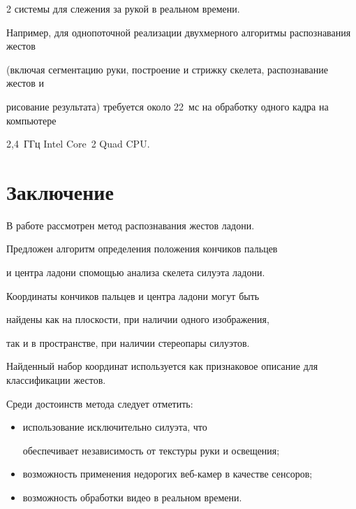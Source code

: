 \begin{multicols}{2}
системы для слежения за рукой в реальном времени.


Например, для однопоточной реализации двухмерного алгоритмы распознавания жестов 


(включая сегментацию руки, построение и стрижку скелета, распознавание жестов и 


рисование результата) требуется около 22~мс на обработку одного кадра на компьютере 


2,4~ГГц Intel Core~2 Quad CPU.





\section{Заключение}\label{sec:Conclusion}





В работе рассмотрен метод распознавания жес\-тов ладони.


Предложен алгоритм определения положения кончиков пальцев 


и центра ладони с\linebreak помощью анализа скелета силуэта ладони.


Координаты кончиков пальцев и центра ладони могут быть 


найдены как на плоскости, при наличии одного изображения,


так и в пространстве, при наличии стереопары силуэтов.


Найденный набор координат используется как признаковое описание для классификации жестов.





Среди достоинств метода следует отметить:


\begin{itemize}


\item использование исключительно силуэта, что 


обеспечивает независимость от текстуры руки и освещения;


\item возможность применения недорогих веб-ка\-мер в качестве сенсоров;


\item возможность обработки видео в реальном времени.


\end{itemize}






\end{multicols}
